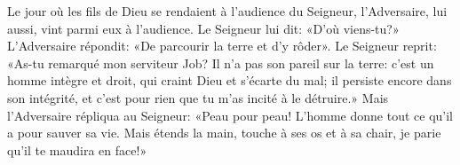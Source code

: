 Le jour où les fils de Dieu se rendaient à l’audience du Seigneur,
	l’Adversaire, lui aussi, vint parmi eux à l’audience.
Le Seigneur lui dit: «D’où viens-tu?»
L’Adversaire répondit: «De parcourir la terre et d’y rôder».
Le Seigneur reprit: «As-tu remarqué mon serviteur Job?
Il n’a pas son pareil sur la terre:
	c’est un homme intègre et droit, qui craint Dieu et s’écarte du mal;
	il persiste encore dans son intégrité,
	et c’est pour rien que tu m’as incité à le détruire.»
Mais l’Adversaire répliqua au Seigneur:
	«Peau pour peau! L’homme donne tout ce qu’il a pour sauver sa vie.
Mais étends la main, touche à ses os et à sa chair,
	je parie qu’il te maudira en face!»
